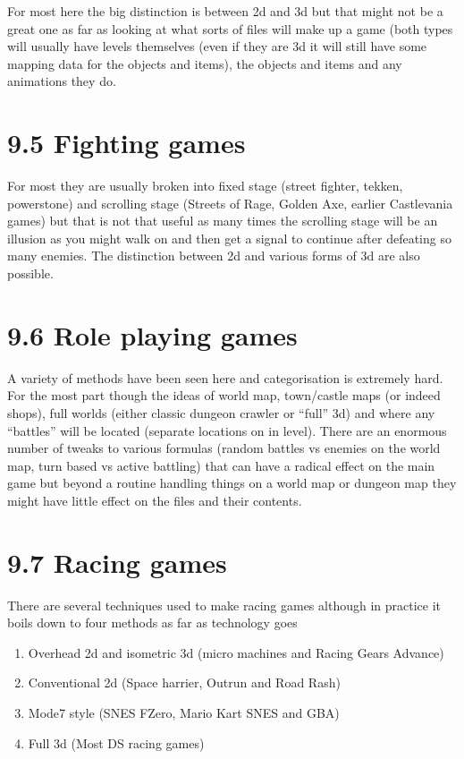 \documentclass[
]{book}
\providecommand{\tightlist}{%
  \setlength{\itemsep}{0pt}\setlength{\parskip}{0pt}}
\begin{document}
For most here the big distinction is between 2d and 3d but that might not be a great one as far as looking at what sorts of files will make up a game (both types will usually have levels themselves (even if they are 3d it will still have some mapping data for the objects and items), the objects and items and any animations they do.

\hypertarget{fighting-games}{%
\section{9.5 Fighting games}\label{fighting-games}}

For most they are usually broken into fixed stage (street fighter, tekken, powerstone) and scrolling stage (Streets of Rage, Golden Axe, earlier Castlevania games) but that is not that useful as many times the scrolling stage will be an illusion as you might walk on and then get a signal to continue after defeating so many enemies. The distinction between 2d and various forms of 3d are also possible.

\hypertarget{role-playing-games}{%
\section{9.6 Role playing games}\label{role-playing-games}}

A variety of methods have been seen here and categorisation is extremely hard. For the most part though the ideas of world map, town/castle maps (or indeed shops), full worlds (either classic dungeon crawler or ``full'' 3d) and where any ``battles'' will be located (separate locations on in level). There are an enormous number of tweaks to various formulas (random battles vs enemies on the world map, turn based vs active battling) that can have a radical effect on the main game but beyond a routine handling things on a world map or dungeon map they might have little effect on the files and their contents.

\hypertarget{racing-games}{%
\section{9.7 Racing games}\label{racing-games}}

There are several techniques used to make racing games although in practice it boils down to four methods as far as technology goes

\begin{enumerate}
\def\labelenumi{\arabic{enumi}.}
\tightlist
\item
  Overhead 2d and isometric 3d (micro machines and Racing Gears Advance)
\item
  Conventional 2d (Space harrier, Outrun and Road Rash)
\item
  Mode7 style (SNES FZero, Mario Kart SNES and GBA)
\item
  Full 3d (Most DS racing games)
\end{enumerate}
\end{document}
